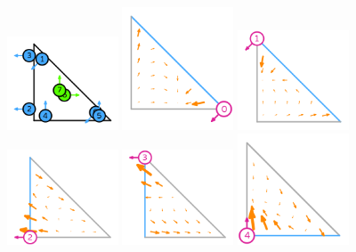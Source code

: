 \begin{center}
\includegraphics[width=3.3cm]{images/pair_raviart-thomas/element-Raviart-Thomas-variant-equispaced-triangle-2-dofs}
\includegraphics[width=3.3cm]{images/pair_raviart-thomas/element-Raviart-Thomas-variant-equispaced-triangle-2-0}
\includegraphics[width=3.3cm]{images/pair_raviart-thomas/element-Raviart-Thomas-variant-equispaced-triangle-2-1}
\includegraphics[width=3.3cm]{images/pair_raviart-thomas/element-Raviart-Thomas-variant-equispaced-triangle-2-2}
\includegraphics[width=3.3cm]{images/pair_raviart-thomas/element-Raviart-Thomas-variant-equispaced-triangle-2-3}
\includegraphics[width=3.3cm]{images/pair_raviart-thomas/element-Raviart-Thomas-variant-equispaced-triangle-2-4}

\end{center}
